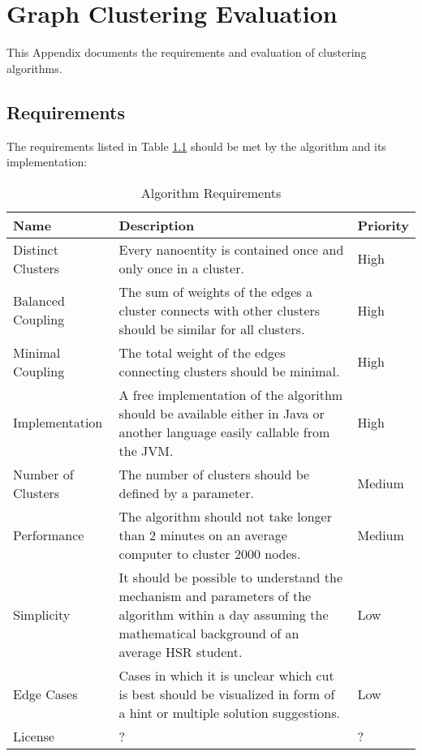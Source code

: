 \chapter{Graph Clustering Evaluation}
\label{appendix:graphClustering}
\label{appendix:graphClusteringAlgs}

This Appendix documents the requirements and evaluation of clustering algorithms. 

\section{Requirements}

The requirements listed in Table \ref{tab:requirementsAlgorithm} should be met by the algorithm and its implementation:

\begin{table}[H]
	\centering
	\caption{Algorithm Requirements}
	\label{tab:requirementsAlgorithm}
	\begin{tabular}{|p{100pt}|p{250pt}|p{50pt}|}
		\hline	
		Name & Description & Priority \\
		\hline
		Distinct Clusters & Every nanoentity is contained once and only once in a cluster. & High  \\
		\hline
		Balanced Coupling & The sum of weights of the edges a cluster connects with other clusters should be similar for all clusters. & High \\ %
		\hline
		Minimal Coupling & The total weight of the edges connecting clusters should be minimal. & High \\
		\hline
		Implementation & A free implementation of the algorithm should be available either in Java or another language easily callable from the \gls{JVM}. & High  \\
		\hline
		Number of Clusters & The number of clusters should be defined by a parameter. & Medium \\
		\hline
		Performance & The algorithm should not take longer than 2 minutes on an average computer to cluster 2000 nodes.& Medium \\
		\hline
		Simplicity & It should be possible to understand the mechanism and parameters of the algorithm within a day assuming the mathematical background of an average \gls{HSR} student. & Low \\
		\hline
		Edge Cases & Cases in which it is unclear which cut is best should be visualized in form of a hint or multiple solution suggestions. & Low \\
		\hline
		License & ? & ? \\
		\hline
	\end{tabular}
\end{table}

